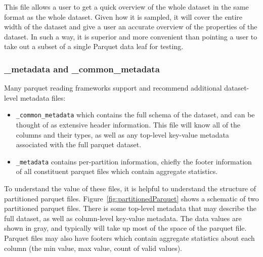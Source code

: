 \documentclass[11pt,a4paper]{ivoa}
\begin{document}
This file allows a user to get a quick overview of the whole dataset in the same format as the whole dataset. 
Given how it is sampled, it will cover the entire width of the dataset and give a user an accurate overview of the properties of the dataset. 
In such a way, it is superior and more convenient than pointing a user to take out a subset of a single Parquet data leaf for testing. 

\subsubsection{\_metadata and \_common\_metadata} 

Many parquet reading frameworks support and recommend additional dataset-level metadata files:
\begin{itemize}
    \item \texttt{\_common\_metadata} which contains the full schema of the dataset, and can be thought of as extensive header information. 
    This file will know all of the columns and their types, as well as any top-level key-value metadata associated with the full parquet dataset.
    \item \texttt{\_metadata} contains per-partition information, chiefly the footer information of all constituent parquet files which contain aggregate statistics.
\end{itemize}

To understand the value of these files, it is helpful to understand the structure of partitioned parquet files. 
Figure~\ref{fig:partitionedParquet} shows a schematic of two partitioned parquet files. 
There is some top-level metadata that may describe the full dataset, as well as column-level key-value metadata.
The data values are shown in gray, and typically will take up most of the space of the parquet file. 
Parquet files may also have footers which contain aggregate statistics about each column (the min value, max value, count of valid values).
\end{document}
